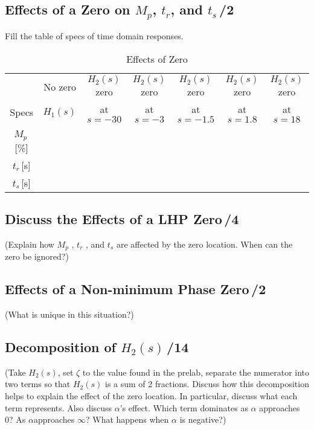 \documentclass{article}
\newcommand{\score}{\hfill \underline{\hspace{0.65cm}}\,/} %
\begin{document}
\subsection{Effects of a Zero on $M_p$, $t_r$, and $t_s$\score 2}
Fill the table of specs of time domain responses.

\begin{table}[phtb]\footnotesize 
\begin{center}
\caption{Effects of Zero}
\label{tbl:lab2_q2}
\begin{tabular}{c|c|c|c|c|c|c} \hline \hline
\rowcolor{Grey} & No zero & $H_2(s)$ zero &  $H_2(s)$ zero &  $H_2(s)$ zero  &  $H_2(s)$ zero &  $H_2(s)$ zero \\
\rowcolor{Grey} Specs & $H_1(s)$ & at $s = -30$ & at $s = -3$ &  at $s = -1.5$ &   at $s = 1.8$ &   at $s = 18$ \\ \hline
$M_p$\,[\%] &  &  &  &  &  &  \\ \hline
$t_r$\,[s] &  &  &  &  &  &  \\ \hline
$t_s$\,[s] &  &  &  &  &  & \\ \hline
\end{tabular}
\end{center}
\end{table}

\subsection{Discuss the Effects of a LHP Zero\score 4}
(Explain how $M_p$ , $t_r$ , and $t_s$ are affected by the zero location. When can the zero be ignored?)

\subsection{Effects of a Non-minimum Phase Zero\score 2}
(What is unique in this situation?)

\subsection{Decomposition of $H_2(s)$\score 14}
(Take $H_2(s)$, set $\zeta$ to the value found in the prelab, separate the numerator into two terms so that $H_2(s)$ is a sum of 2 fractions. Discuss how this decomposition helps to explain the effect of the zero location. In particular, discuss what each term represents. Also discuss $\alpha$'s effect. Which term dominates as $\alpha$ approaches 0? As $\alpha$approaches $\infty$?  What happens when $\alpha$ is negative?)
\end{document}
